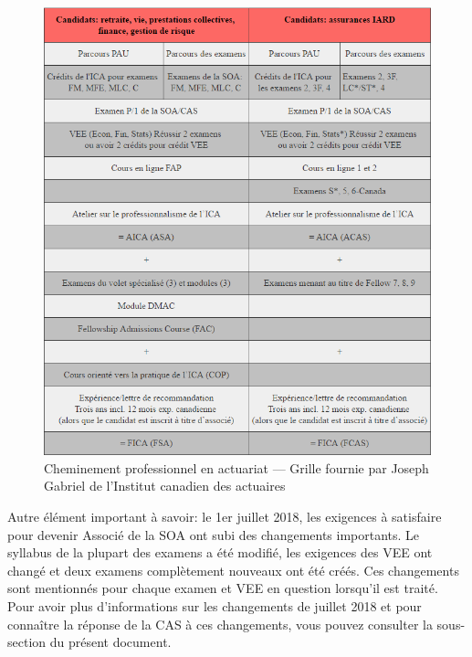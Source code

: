 \begin{center}
\begin{figure}[hp]
\includegraphics[width=1\textwidth]{tableau_ICA.png}
\caption{Cheminement professionnel en actuariat --- Grille fournie par Joseph Gabriel de l'Institut canadien des actuaires}
\end{figure}
\par
\end{center}


Autre élément important à savoir: le 1er juillet 2018, les exigences à satisfaire pour devenir Associé de la SOA ont subi des changements importants. Le syllabus de la plupart des examens a été modifié, les exigences des VEE ont changé et deux examens complètement nouveaux ont été créés. Ces changements sont mentionnés pour chaque examen et VEE en question lorsqu'il est traité. Pour avoir plus d'informations sur les changements de juillet 2018 et pour connaître la réponse de la CAS à ces changements, vous pouvez consulter la sous-section  du présent document. \vspace{\baselineskip}

